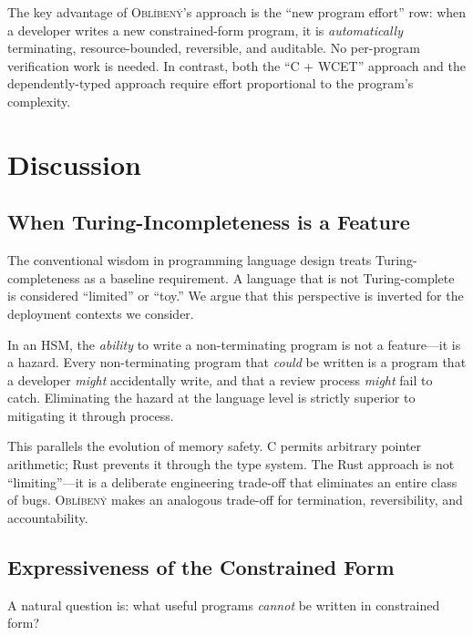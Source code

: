 \documentclass[11pt,a4paper]{article}
\newcommand{\obl}{\textsc{Obl\'{i}ben\'{y}}}
\begin{document}
The key advantage of \obl{}'s approach is the ``new program effort'' row: when
a developer writes a new constrained-form program, it is \emph{automatically}
terminating, resource-bounded, reversible, and auditable.  No per-program
verification work is needed.  In contrast, both the ``C + WCET'' approach and
the dependently-typed approach require effort proportional to the program's
complexity.


\section{Discussion}
\label{sec:discussion}

\subsection{When Turing-Incompleteness is a Feature}

The conventional wisdom in programming language design treats
Turing-completeness as a baseline requirement.  A language that is not
Turing-complete is considered ``limited'' or ``toy.''  We argue that this
perspective is inverted for the deployment contexts we consider.

In an HSM, the \emph{ability} to write a non-terminating program is not a
feature---it is a hazard.  Every non-terminating program that \emph{could} be
written is a program that a developer \emph{might} accidentally write, and
that a review process \emph{might} fail to catch.  Eliminating the hazard at
the language level is strictly superior to mitigating it through process.

This parallels the evolution of memory safety.  C permits arbitrary pointer
arithmetic; Rust prevents it through the type system.  The Rust approach is
not ``limiting''---it is a deliberate engineering trade-off that eliminates an
entire class of bugs.  \obl{} makes an analogous trade-off for termination,
reversibility, and accountability.

\subsection{Expressiveness of the Constrained Form}

A natural question is: what useful programs \emph{cannot} be written in
constrained form?
\end{document}

